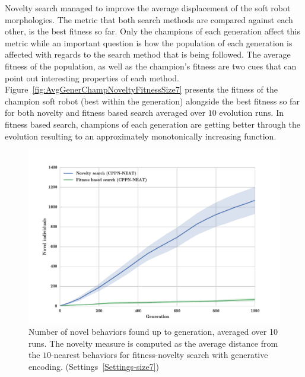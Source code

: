 Novelty search managed to improve the average displacement of the soft robot morphologies. The metric that both search methods are compared against each other, is the best fitness so far. Only the champions of each generation affect this metric while an important question is how the population of each generation is affected with regards to the search method that is being followed. The average fitness of the population, as well as the champion's fitness are two cues that can point out interesting properties of each method. Figure~\ref{fig:AvgGenerChampNoveltyFitnessSize7} presents the fitness of the champion soft robot (best within the generation) alongside the best fitness so far for both novelty and fitness based search averaged over $10$ evolution runs. In fitness based search, champions of each generation are getting better through the evolution resulting to an approximately monotonically increasing function. 
\begin{figure}[t!]
\centering
\includegraphics[width=1.0\textwidth]{../Figures/Results/novelIndividualsFitNovComp.pdf}
\caption{Number of novel behaviors found up to generation, averaged over 10 runs. The novelty measure is computed as the average distance from the $10$-nearest behaviors for fitness-novelty search with generative encoding. (Settings~\ref{Settings-size7})}
\label{fig:novelIndividualsFitNovComp}
\end{figure}
